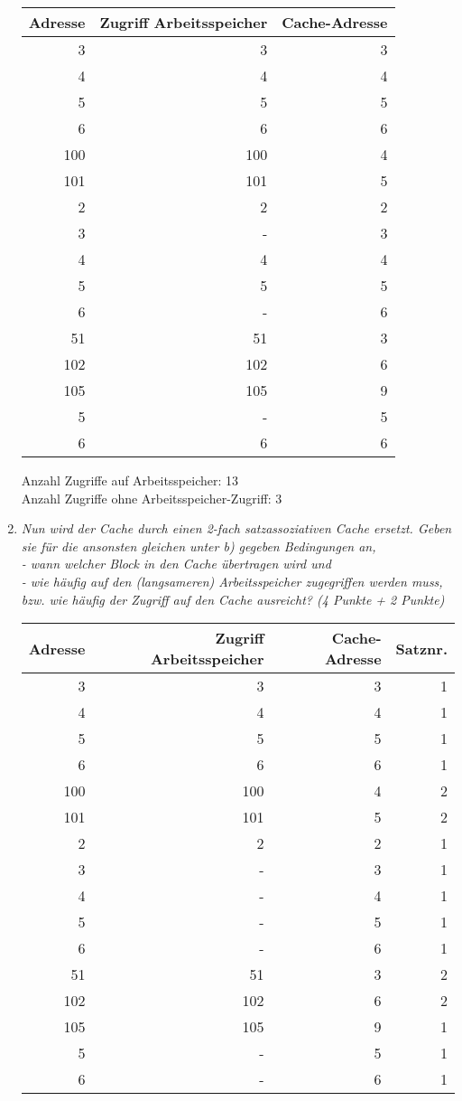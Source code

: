 \documentclass[10pt]{article}
\begin{document}
\begin{enumerate}[label=\alph*)]
		\begin{tabular}{r | r | r}
		Adresse & Zugriff Arbeitsspeicher & Cache-Adresse\\
		\hline
		3	& 	3 	& 3 \\
		4	&	4 	& 4 \\
		5	&	5 	& 5 \\
		6	&	6 	& 6 \\
		100	&	100 & 4 \\
		101	&	101	& 5 \\
		2	&	2	& 2 \\
		3	&	-	& 3 \\
		4	&	4	& 4 \\
		5	&	5	& 5 \\
		6	&	-	& 6 \\
		51	&	51	& 3 \\
		102 &	102 & 6 \\
		105 &	105 & 9 \\  %
		5	&	-	& 5 \\ %
		6	&	6	& 6 \\
		\end{tabular}
		
		Anzahl Zugriffe auf Arbeitsspeicher: 13 \\
		Anzahl Zugriffe ohne Arbeitsspeicher-Zugriff: 3
	\item
		\textit{Nun wird der Cache durch einen 2-fach satzassoziativen Cache ersetzt. Geben sie für die ansonsten gleichen unter b) gegeben Bedingungen an, 	\\- wann welcher Block in den Cache übertragen wird und \\- wie häufig auf den (langsameren) Arbeitsspeicher zugegriffen werden muss, bzw. wie häufig der Zugriff auf den Cache ausreicht? (4 Punkte + 2 Punkte)}
		
		\begin{tabular}{r | r | r | r}
		Adresse & Zugriff Arbeitsspeicher & Cache-Adresse & Satznr.\\
		\hline
		3	& 	3 	& 3 	& 1\\
		4	&	4 	& 4 	& 1\\
		5	&	5 	& 5 	& 1\\
		6	&	6 	& 6 	& 1\\
		100	&	100 & 4 	& 2\\
		101	&	101	& 5 	& 2\\
		2	&	2	& 2 	& 1\\
		3	&	-	& 3 	& 1\\
		4	&	-	& 4 	& 1\\ %
		5	&	-	& 5 	& 1\\
		6	&	-	& 6 	& 1\\
		51	&	51	& 3 	& 2\\
		102 &	102 & 6 	& 2\\
		105 &	105 & 9	& 1\\  %
		5	&	-	& 5 	& 1\\
		6	&	-	& 6 	& 1\\
		\end{tabular}
		

\end{enumerate}
\end{document}
